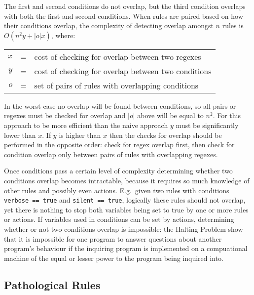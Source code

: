 \noindent{}The first and second conditions do not overlap, but the third
condition overlaps with both the first and second conditions.  When rules
are paired based on how their conditions overlap, the complexity of
detecting overlap amongst $n$ rules is $O\left(n^{2}y+|o|x\right)$, where:

\begin{tabular}[]{rcl}

    $x$ & = & cost of checking for overlap between two regexes    \\
    $y$ & = & cost of checking for overlap between two conditions \\
    $o$ & = & set of pairs of rules with overlapping conditions   \\

\end{tabular}

In the worst case no overlap will be found between conditions, so all pairs
or regexes must be checked for overlap and $|o|$ above will be equal to
$n^{2}$.  For this approach to be more efficient than the naive approach
$y$ must be significantly lower than $x$.  If $y$ is higher than $x$ then
the checks for overlap should be performed in the opposite order: check for
regex overlap first, then check for condition overlap only between pairs of
rules with overlapping regexes.

Once conditions pass a certain level of complexity determining whether two
conditions overlap becomes intractable, because it requires so much
knowledge of other rules and possibly even actions.  E.g.\ given two rules
with conditions \verb!verbose == true! and \verb!silent == true!, logically
these rules should not overlap, yet there is nothing to stop both variables
being set to true by one or more rules or actions.  If variables used in
conditions can be set by actions, determining whether or not two conditions
overlap is impossible: the Halting Problem show that it is impossible for
one program to answer questions about another program's behaviour if the
inquiring program is implemented on a compuational machine of the equal or
lesser power to the program being inquired into.

\subsection{Pathological Rules}

